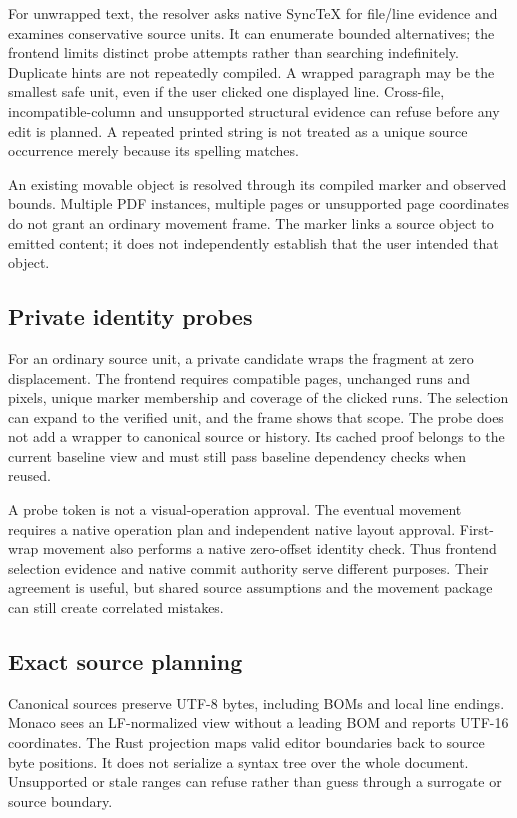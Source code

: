 For unwrapped text, the resolver asks native SyncTeX for file/line evidence
and examines conservative source units. It can enumerate bounded alternatives;
the frontend limits distinct probe attempts rather than searching indefinitely.
Duplicate hints are not repeatedly compiled. A wrapped paragraph may be the
smallest safe unit, even if the user clicked one displayed line. Cross-file,
incompatible-column and unsupported structural evidence can refuse before
any edit is planned. A repeated printed string is not treated as a unique
source occurrence merely because its spelling matches.

An existing movable object is resolved through its compiled marker and
observed bounds. Multiple PDF instances, multiple pages or unsupported page
coordinates do not grant an ordinary movement frame. The marker links a
source object to emitted content; it does not independently establish that
the user intended that object.

\subsection{Private identity probes}
For an ordinary source unit, a private candidate wraps the fragment at zero
displacement. The frontend requires compatible pages, unchanged runs and
pixels, unique marker membership and coverage of the clicked runs. The
selection can expand to the verified unit, and the frame shows that scope.
The probe does not add a wrapper to canonical source or history. Its cached
proof belongs to the current baseline view and must still pass baseline
dependency checks when reused.

A probe token is not a visual-operation approval. The eventual movement
requires a native operation plan and independent native layout approval.
First-wrap movement also performs a native zero-offset identity check. Thus
frontend selection evidence and native commit authority serve different
purposes. Their agreement is useful, but shared source assumptions and the
movement package can still create correlated mistakes.

\subsection{Exact source planning}
Canonical sources preserve UTF-8 bytes, including BOMs and local line endings.
Monaco sees an LF-normalized view without a leading BOM and reports UTF-16
coordinates. The Rust projection maps valid editor boundaries back to source
byte positions. It does not serialize a syntax tree over the whole document.
Unsupported or stale ranges can refuse rather than guess through a surrogate
or source boundary.


